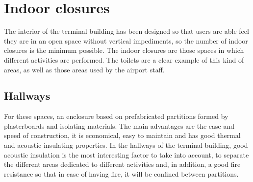 \chapter{Indoor closures}
The interior of the terminal building has been designed so that users are able feel they are in an open space without vertical impediments, so the number of indoor closures is the minimum possible. The indoor closures are those spaces in which different activities are performed. The toilets are a clear example of this kind of areas, as well as those areas used by the airport staff.

	\section{Hallways}
For these spaces, an enclosure based on prefabricated partitions formed by plasterboards and isolating materials. The main advantages are the ease and speed of construction, it is economical, easy to maintain and has good thermal and acoustic insulating properties. In the hallways of the terminal building, good acoustic insulation is the most interesting factor to take into account, to separate the different areas dedicated to different activities and, in addition, a good fire resistance so that in case of having fire, it will be confined between partitions.
		
